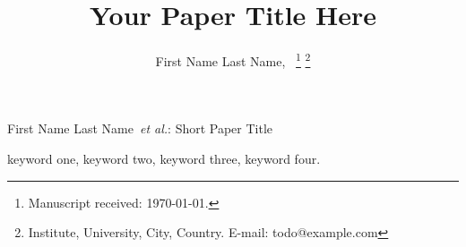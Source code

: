 
\newcommand{\authorname}{First Name Last Name}
\newcommand{\authoremail}{todo@example.com}
\newcommand{\authorinstitute}{Institute, University, City, Country}
\newcommand{\papertitle}{Your Paper Title Here}
\newcommand{\papershorttitle}{Short Paper Title}


\title{\papertitle}

\author{\authorname,~
\thanks{Manuscript received: \today.}
\thanks{\authorinstitute. E-mail: \authoremail}
}

%
{\authorname~\MakeLowercase{\textit{et al.}}: \papershorttitle}

\maketitle

\begin{abstract}
\blindtext
\end{abstract}

\begin{IEEEkeywords}
keyword one, keyword two, keyword three, keyword four.
\end{IEEEkeywords}